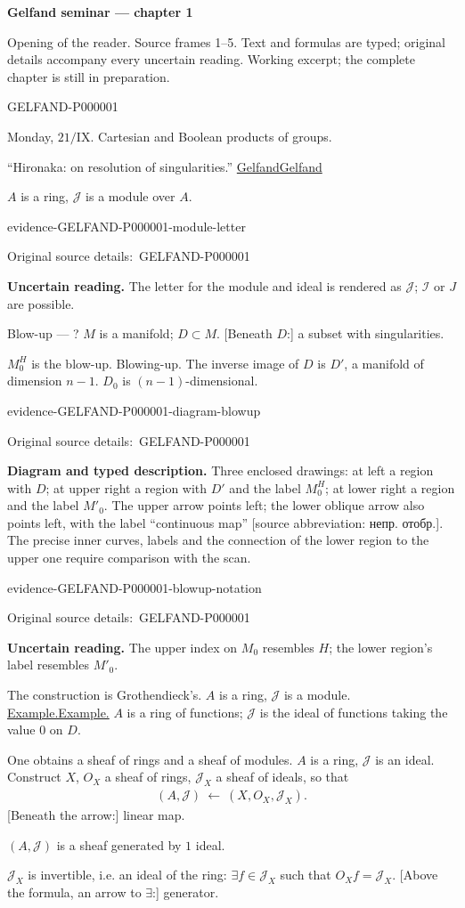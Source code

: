 \documentclass[11pt]{article}
\let\MathUnderline\underline
\renewcommand{\underline}[1]{\ifmmode\MathUnderline{#1}\else\uline{#1}\fi}
\newcommand{\SourcePage}[2]{\par\smallskip\phantomsection\label{#1:source-page}{\small\sffamily\color{blue!55!black}#1}\par\smallskip}
\newcommand{\EvidenceBlock}[4]{%
 \par\smallskip\noindent\begin{minipage}{\linewidth}
 \begin{minipage}[t]{.47\linewidth}\vspace{0pt}\centering
 \csname evidence-#1-#2\endcsname\par
 {\scriptsize\SourceCropCaption\ #1}\par
 \end{minipage}\hfill
 \begin{minipage}[t]{.49\linewidth}\vspace{0pt}\raggedright
 {\small\color{orange!65!black}\textbf{#4} #3}\par
 \end{minipage}
 \end{minipage}\par\smallskip}
\newcommand{\Unclear}[3]{\EvidenceBlock{#1}{#2}{#3}{\ReadingCaption}}
\newcommand{\SourceFigure}[3]{\EvidenceBlock{#1}{#2}{#3}{\DiagramCaption}}
\newcommand{\SourceCropCaption}{Original source details:}\newcommand{\ReadingCaption}{Uncertain reading.}\newcommand{\IncompleteCaption}{Undeciphered passage.}\newcommand{\DiagramCaption}{Diagram and typed description.}
\begin{document}
{\large\bfseries Gelfand seminar — chapter 1}\par
{\small Opening of the reader. Source frames 1–5. Text and formulas are typed; original details accompany every uncertain reading. Working excerpt; the complete chapter is still in preparation.}\par\medskip
\SourcePage{GELFAND-P000001}{unlabelled}
Monday, $21/\mathrm{IX}$.
Cartesian and Boolean products of groups.

``Hironaka: on resolution of singularities.''
\underline{Gelfand}

$A$ is a ring, $\mathcal{J}$ is a module over $A$.
\Unclear{GELFAND-P000001}{module-letter}{The letter for the module and ideal is rendered as $\mathcal{J}$; $\mathcal{I}$ or $J$ are possible.}

Blow-up --- ?
$M$ is a manifold; $D\subset M$.
[Beneath $D$:] a subset with singularities.

$M_0^H$ is the blow-up. Blowing-up.
The inverse image of $D$ is $D'$, a manifold of dimension $n-1$.
$D_0$ is $(n-1)$-dimensional.
\SourceFigure{GELFAND-P000001}{diagram-blowup}{Three enclosed drawings: at left a region with $D$; at upper right a region with $D'$ and the label $M_0^H$; at lower right a region and the label $M'_0$. The upper arrow points left; the lower oblique arrow also points left, with the label ``continuous map'' [source abbreviation: непр. отобр.]. The precise inner curves, labels and the connection of the lower region to the upper one require comparison with the scan.}
\Unclear{GELFAND-P000001}{blowup-notation}{The upper index on $M_0$ resembles $H$; the lower region's label resembles $M'_0$.}

The construction is Grothendieck's.
$A$ is a ring, $\mathcal{J}$ is a module.
\underline{Example.} $A$ is a ring of functions;
$\mathcal{J}$ is the ideal of functions taking the value $0$ on $D$.

One obtains a sheaf of rings and a sheaf of modules.
$A$ is a ring, $\mathcal{J}$ is an ideal.
Construct $X$, $O_X$ a sheaf of rings,
$\mathcal{J}_X$ a sheaf of ideals, so that
\begin{gather*}
 (A,\mathcal{J})\ \longleftarrow\ (X,O_X,\mathcal{J}_X).
\end{gather*}
[Beneath the arrow:] linear map.

$(A,\mathcal{J})$ is a sheaf generated by $1$ ideal.

$\mathcal{J}_X$ is invertible, i.e. an ideal of the ring:
$\exists f\in\mathcal{J}_X$ such that $O_Xf=\mathcal{J}_X$.
[Above the formula, an arrow to $\exists$:] generator.
\end{document}
